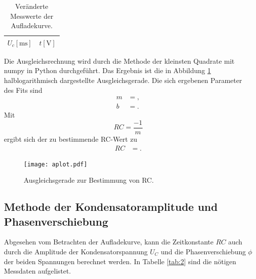 \begin{table}[H]
  \centering
  \caption{Veränderte Messwerte der Aufladekurve.}
  \label{tab:werte_a_neu}
  \begin{tabular}{c c}
    \toprule
    {$U_c [\si{\milli\second}]$} & {$t [\si{\volt}]$}\\
    \midrule
    
    \bottomrule
  \end{tabular}
\end{table}

Die Ausgleichsrechnung wird durch die Methode der kleinsten Quadrate mit numpy in Python durchgeführt.
Das Ergebnis ist die in Abbildung \ref{fig:plot_a} halblogarithmisch dargestellte Ausgleichsgerade.
Die sich ergebenen Parameter des Fits sind
\begin{align*}
  m &= , \\
  b &= .
\end{align*}
Mit
\begin{equation}
  RC = \frac{-1}{m}
\end{equation}
ergibt sich der zu bestimmende RC-Wert zu
\begin{align}
  RC &= .
\end{align}
\begin{figure}[H]
  \centering
  \texttt{[image: aplot.pdf]}
  \caption{Ausgleichsgerade zur Bestimmung von RC.}
  \label{fig:plot_a}
\end{figure}

\subsection{Methode der Kondensatoramplitude und Phasenverschiebung}
Abgesehen vom Betrachten der Aufladekurve, kann die Zeitkonstante $RC$ auch durch die Amplitude der Kondensatorspannung $U_C$ und die Phasenverschiebung $\phi$ der beiden Spannungen berechnet werden.
In Tabelle \ref{tab:2} sind die nötigen Messdaten aufgelistet.
%
%    
%

